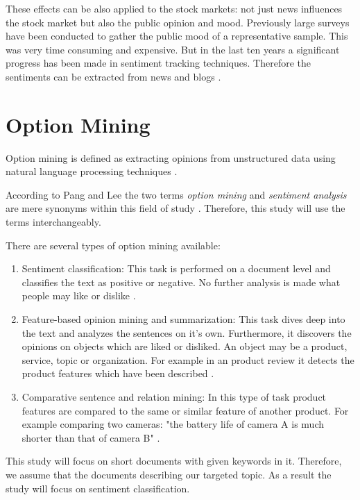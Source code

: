 These effects can be also applied to the stock markets: not just news influences the stock market but also the public opinion and mood.
Previously large surveys have been conducted to gather the public mood of a representative sample.
This was very time consuming and expensive.
But in the last ten years a significant progress has been made in sentiment tracking techniques.
Therefore the sentiments can be extracted from news and blogs
\cite{Bollen2011a}.


\section{Option Mining} 
\label{s:background-optionmining}

Option mining is defined as extracting opinions from unstructured data using natural language processing techniques \cite[page 411]{Liu2007}.

According to Pang and Lee the two terms \emph{option mining} and \emph{sentiment analysis} are mere synonyms within this field of study \cite{Pang2008c}.
Therefore, this study will use the terms interchangeably.

There are several types of option mining available:

\begin{enumerate}
	\item 
	Sentiment classification: 
	This task is performed on a document level and classifies the text as positive or negative. 
	No further analysis is made what people may like or dislike 
	\cite[page 411]{Liu2007}.
	
	\item 
	Feature-based opinion mining and summarization: 
	This task dives deep into the text and analyzes the sentences on it's own.
	Furthermore, it discovers the opinions on objects which are liked or disliked.
	An object may be a product, service, topic or organization. 
	For example in an product review it detects the product features which have been described 
	\cite[page 412]{Liu2007}.
	
	\item
	Comparative sentence and relation mining:
	In this type of task product features are compared to the same or similar feature of another product.
	For example comparing two cameras: "the battery life of camera A is much shorter than that of camera B" 
	\cite[page 412]{Liu2007}. 
\end{enumerate}

This study will focus on short documents with given keywords in it. 
Therefore, we assume that the documents describing our targeted topic.
As a result the study will focus on sentiment classification.

